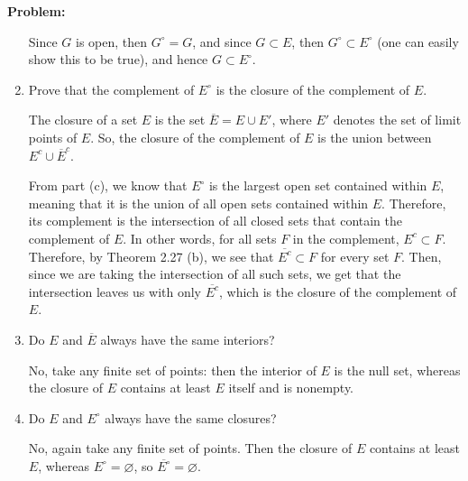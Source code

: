 \documentclass[10pt]{article}
\newenvironment{problem}{\textbf{Problem:}}{}
\begin{document}
\begin{problem}
\begin{enumerate}[label=\alph*)]
				\begin{solution}
					Since \( G \) is open, then \( G^{\circ} = G \), and since \( G \subset E \), then 
					\( G^{\circ} \subset E^{\circ} \) (one can easily show this to be true), 
					and hence \( G \subset E^{\circ} \). 
				\end{solution}
			\item Prove that the complement of \( E^{\circ} \) is the closure of the complement of \( E \). 

				\begin{solution}
					The closure of a set \( E \) is the set \( \overline E = E \cup E' \), where \( E' \) 
					denotes the set of limit points of \( E \). So, the closure 
					of the complement of \( E \) is the union between \( E^{c} \cup \overline E^{c} \).  

					From part (c), we know that \( E^{\circ} \) is the largest open set contained within 
					\( E \), meaning 
					that it is the union of all open sets contained within \( E \). Therefore, its complement 
					is the intersection of all closed sets that contain the complement of \( E \). In other words, 
					for all sets \( F \) in the complement, \( E^{c} \subset F \). Therefore, by Theorem 
					2.27 (b), we see that \( \overline {E^{c}} \subset F \) for every set \( F \). Then, since 
					we are taking the intersection of all such sets, we get that the intersection leaves us 
					with only \( \overline{E^{c}} \), which is the closure of the complement of \( E \). 
				\end{solution}
			\item Do \( E \) and \( \overline E \) always have the same interiors?

				\begin{solution}
					No, take any finite set of points: then the interior of \( E \) is the null set, whereas
					the closure of \( E \) contains at least \( E \) itself and is nonempty.
				\end{solution}
			\item Do  \( E \) and \( E^{\circ} \) always have the same closures? 

				\begin{solution}
					No, again take any finite set of points. Then the closure of \( E \) contains at least \( E \), 
					whereas \( E^{\circ} = \varnothing\), so \( \overline{E^{\circ}} = \varnothing \). 
				\end{solution}
		\end{enumerate}
	\end{problem}
\end{document}
